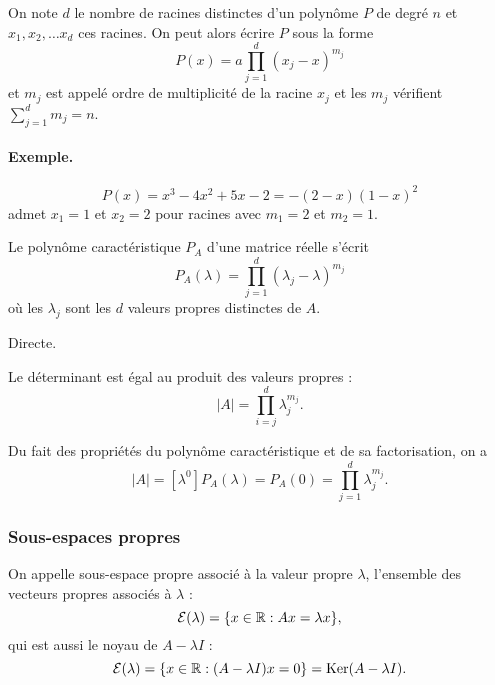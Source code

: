 \begin{definition}
  On note $d$ le nombre de racines distinctes d'un polynôme $P$ de degré $n$ et $x_1, x_2, \dots x_d$ ces racines. On peut alors écrire $P$ sous la forme
  $$
  P(x) = a \prod_{j=1}^d (x_j - x)^{m_j}
  $$
  et $m_j$ est appelé ordre de multiplicité de la racine $x_j$ et les $m_j$ vérifient $ \sum_{j=1}^d m_j = n$.
\end{definition}

\paragraph*{Exemple.} 
$$
P(x) = x^3 - 4x^2 + 5x - 2 = - (2-x)(1-x)^2
$$ 
admet $x_1 = 1$ et $x_2 = 2$ pour racines avec $m_1 = 2$ et $m_2 = 1$.


\begin{corollary*}
  Le polynôme caractéristique $P_A$ d'une matrice réelle s'écrit
  $$
  P_A(\lambda) = \prod_{j=1}^d (\lambda_j - \lambda)^{m_j}
  $$
  où les $\lambda_j$ sont les $d$ valeurs propres distinctes de $A$.
\end{corollary*}

\proof
Directe.\eproof

\begin{corollary*}
  Le déterminant est égal au produit des valeurs propres : 
  $$
  |A| = \prod_{i=j}^d \lambda_j^{m_j}.
  $$
\end{corollary*}

\proof
  Du fait des propriétés du polynôme caractéristique et de sa factorisation, on a
  $$
  |A| = [\lambda^0]P_A(\lambda) = P_A(0) = \prod_{j=1}^d \lambda_j^{m_j}.
  $$
\eproof

\subsubsection{Sous-espaces propres} 

\begin{definition}
  On appelle sous-espace propre associé à la valeur propre $\lambda$, l'ensemble des vecteurs propres associés à $\lambda$ :
  $$
  \mathcal{E}(\lambda) = \{x \in \mathbb{R}: Ax = \lambda x\},
  $$
  qui est aussi le noyau de $A - \lambda I$ : 
  $$
  \mathcal{E}(\lambda) = \{x \in \mathbb{R}: (A - \lambda I)x = 0\} = \text{Ker}(A - \lambda I).
  $$
\end{definition}

